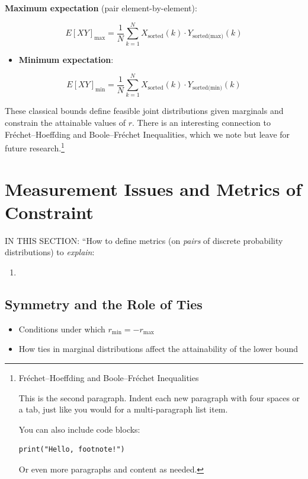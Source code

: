 \documentclass[
  12pt,
]{article}
\providecommand{\tightlist}{%
  \setlength{\itemsep}{0pt}\setlength{\parskip}{0pt}}\usepackage{longtable,booktabs,array}
\theoremstyle{plain}
\theoremstyle{definition}
\theoremstyle{remark}
\begin{document}
\textbf{Maximum expectation} (pair element-by-element):

\[E[XY]_{\text{max}} = \frac{1}{N}\sum_{k=1}^{N} X_{\text{sorted}}(k)\cdot Y_{\text{sorted(max)}}(k)\]

\begin{itemize}
\tightlist
\item
  \textbf{Minimum expectation}:
\end{itemize}

\[E[XY]_{\text{min}} = \frac{1}{N}\sum_{k=1}^{N} X_{\text{sorted}}(k)\cdot Y_{\text{sorted(min)}}(k)\]

These classical bounds define feasible joint distributions given
marginals and constrain the attainable values of \(r\). There is an
interesting connection to Fréchet--Hoeffding and Boole--Fréchet
Inequalities, which we note but leave for future research.\footnote{Fréchet--Hoeffding
  and Boole--Fréchet Inequalities

  This is the second paragraph. Indent each new paragraph with four
  spaces or a tab, just like you would for a multi-paragraph list item.

  You can also include code blocks:

\begin{Verbatim}
print("Hello, footnote!")
\end{Verbatim}

  Or even more paragraphs and content as needed.}

\section{Measurement Issues and Metrics of
Constraint}\label{measurement-issues-and-metrics-of-constraint-1}

IN THIS SECTION: ``How to define metrics (on \emph{pairs} of discrete
probability distributions) to \emph{explain}:

\begin{enumerate}
\def\labelenumi{\arabic{enumi}.}
\tightlist
\item
\end{enumerate}

\subsection{Symmetry and the Role of
Ties}\label{symmetry-and-the-role-of-ties}

\begin{itemize}
\tightlist
\item
  Conditions under which \(r_{\min} = -r_{\max}\)
\item
  How ties in marginal distributions affect the attainability of the
  lower bound
\end{itemize}
\end{document}
